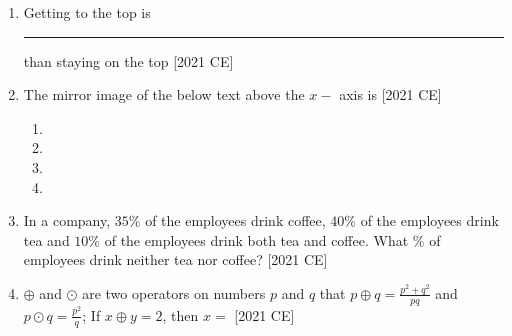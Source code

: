 \documentclass[journal]{IEEEtran}
\begin{document}
\begin{enumerate}
    \item Getting to the top is \rule{2cm}{0.4pt} than staying on the top \hfill [2021 CE]
    \begin{enumerate}
    \end{enumerate}
    \item The mirror image of the below text above the $x-$ axis is \hfill [2021 CE]
    
    \begin{enumerate}
        \item 
        \item 
        \item 
        \item 
    \end{enumerate}
    \item In a company, $35\%$ of the employees drink coffee, $40\%$ of the employees
drink tea and $10\%$ of the employees drink both tea and coffee. What $\%$ of
employees drink neither tea nor coffee? \hfill [2021 CE]
\begin{enumerate}
\end{enumerate}
\item $\oplus $ and $\odot$ are two operators on numbers $p$ and $q$ that $p \oplus q = \frac{p^2 + q^2}{pq}$ and $p \odot q = \frac{p^2}{q}$;
If $x \oplus y = 2$, then $x = $ \hfill [2021 CE]
\begin{enumerate}
\end{enumerate}
\end{enumerate}
\end{document}
